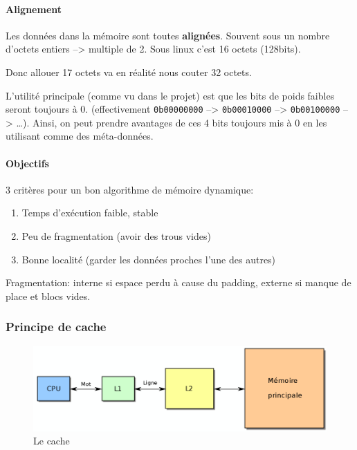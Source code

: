 \paragraph{Alignement}\label{alignement}

Les données dans la mémoire sont toutes \textbf{alignées}. Souvent sous
un nombre d'octets entiers --\textgreater{} multiple de 2. Sous linux
c'est 16 octets (128bits).

Donc allouer 17 octets va en réalité nous couter 32 octets.

L'utilité principale (comme vu dans le projet) est que les bits de poids
faibles seront toujours à 0. (effectivement \texttt{0b00000000}
--\textgreater{} \texttt{0b00010000} --\textgreater{}
\texttt{0b00100000} --\textgreater{} \ldots). Ainsi, on peut prendre
avantages de ces 4 bits toujours mis à 0 en les utilisant comme des
méta-données.

\paragraph{Objectifs}\label{objectifs}

3 critères pour un bon algorithme de mémoire dynamique:

\begin{enumerate}
\def\labelenumi{\arabic{enumi}.}
\tightlist
\item
  Temps d'exécution faible, stable
\item
  Peu de fragmentation (avoir des trous vides)
\item
  Bonne localité (garder les données proches l'une des autres)
\end{enumerate}

Fragmentation: interne si espace perdu à cause du padding, externe si
manque de place et blocs vides.

\subsubsection{Principe de cache}\label{principe-de-cache}

\begin{figure}
\centering
\includegraphics{image-49.png}
\caption{Le cache}
\end{figure}


